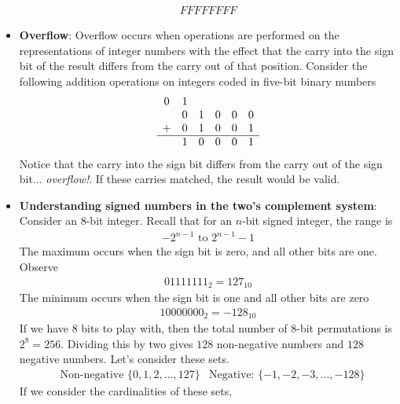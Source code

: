 \documentclass{report}
\begin{document}
\begin{itemize}
\begin{align*}
                FFFFFFFF
            \end{align*}
        \item \textbf{Overflow}: Overflow occurs when operations are performed on the representations of integer numbers with the effect that the carry into the sign bit of the result differs from the carry out of that position. Consider the following addition operations on integers coded in five-bit binary numbers
            \begin{align*}
                \begin{array}{cccccc}
                    0&1&&&& \\
                    &0&1&0&0&0\\
                    +&0&1&0&0&1 \\
                    \hline 
                     &1&0&0&0&1
                \end{array}
            \end{align*}
            Notice that the carry into the sign bit differs from the carry out of the sign bit... \textit{overflow!}. If these carries matched, the result would be valid.
        \item \textbf{Understanding signed numbers in the two's complement system}: Consider an 8-bit integer. Recall that for an $n$-bit signed integer, the range is
            \begin{align*}
                -2^{n-1} \text{ to } 2^{n-1}-1
            \end{align*}
            The maximum occurs when the sign bit is zero, and all other bits are one. Observe
            \begin{align*}
                01111111_{2} = 127_{10}
            \end{align*}
            The minimum occurs when the sign bit is one and all other bits are zero
            \begin{align*}
                10000000_{2} = -128_{10}
            \end{align*}
            If we have $8$ bits to play with, then the total number of 8-bit permutations is $2^{8} = 256$. Dividing this by two gives $128$ non-negative numbers and $128$ negative numbers. Let's consider these sets. 
            \begin{align*}
                &\text{Non-negative } \{0,1,2,...,127\}
                &\text{Negative: } \{-1,-2,-3,...,-128\}
            \end{align*}
            If we consider the cardinalities of these sets,

\end{itemize}
\end{document}
